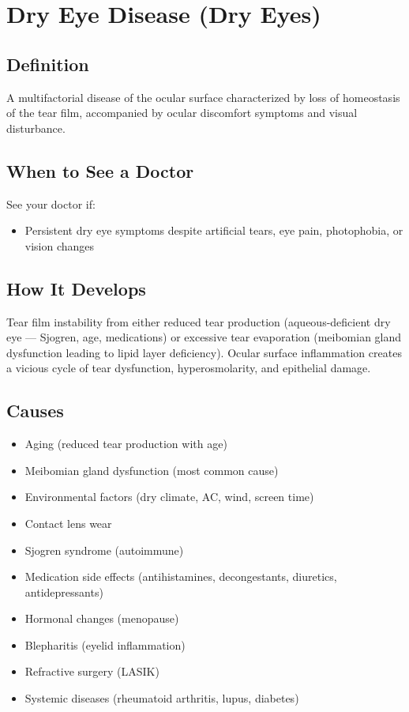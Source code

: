 \chapter{Dry Eye Disease (Dry Eyes)}

\section*{Definition}
A multifactorial disease of the ocular surface characterized by loss of homeostasis of the tear film, accompanied by ocular discomfort symptoms and visual disturbance.

\section*{When to See a Doctor}
See your doctor if:
\begin{itemize}
  \item Persistent dry eye symptoms despite artificial tears, eye pain, photophobia, or vision changes
\end{itemize}

\section*{How It Develops}
Tear film instability from either reduced tear production (aqueous-deficient dry eye — Sjogren, age, medications) or excessive tear evaporation (meibomian gland dysfunction leading to lipid layer deficiency). Ocular surface inflammation creates a vicious cycle of tear dysfunction, hyperosmolarity, and epithelial damage.

\section*{Causes}
\begin{itemize}
  \item Aging (reduced tear production with age)
  \item Meibomian gland dysfunction (most common cause)
  \item Environmental factors (dry climate, AC, wind, screen time)
  \item Contact lens wear
  \item Sjogren syndrome (autoimmune)
  \item Medication side effects (antihistamines, decongestants, diuretics, antidepressants)
  \item Hormonal changes (menopause)
  \item Blepharitis (eyelid inflammation)
  \item Refractive surgery (LASIK)
  \item Systemic diseases (rheumatoid arthritis, lupus, diabetes)
\end{itemize}

